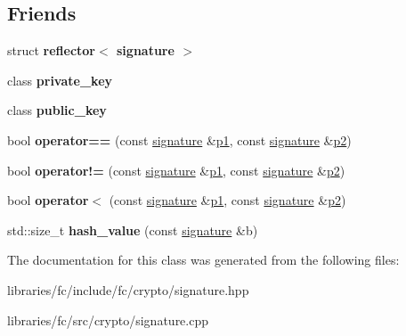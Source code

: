 \subsection*{Friends}
\begin{DoxyCompactItemize}
\item 
\mbox{\label{classfc_1_1crypto_1_1signature_af455309b47ab8c41e1dd36b91498fb47}} 
struct {\bfseries reflector$<$ signature $>$}
\item 
\mbox{\label{classfc_1_1crypto_1_1signature_ae1389c6c19ec8630ce31970de2294915}} 
class {\bfseries private\+\_\+key}
\item 
\mbox{\label{classfc_1_1crypto_1_1signature_a02ee1fa9fb75a71bb167b80862443a52}} 
class {\bfseries public\+\_\+key}
\item 
\mbox{\label{classfc_1_1crypto_1_1signature_ac2e519e4ae4118c9d1801c20f94c893b}} 
bool {\bfseries operator==} (const \mbox{\hyperlink{classfc_1_1crypto_1_1signature}{signature}} \&\mbox{\hyperlink{classp1}{p1}}, const \mbox{\hyperlink{classfc_1_1crypto_1_1signature}{signature}} \&\mbox{\hyperlink{classp2}{p2}})
\item 
\mbox{\label{classfc_1_1crypto_1_1signature_a44b742772ed7aa3e516dd4625abfe1d8}} 
bool {\bfseries operator!=} (const \mbox{\hyperlink{classfc_1_1crypto_1_1signature}{signature}} \&\mbox{\hyperlink{classp1}{p1}}, const \mbox{\hyperlink{classfc_1_1crypto_1_1signature}{signature}} \&\mbox{\hyperlink{classp2}{p2}})
\item 
\mbox{\label{classfc_1_1crypto_1_1signature_afb044052136e9b7515e3da14772089d1}} 
bool {\bfseries operator$<$} (const \mbox{\hyperlink{classfc_1_1crypto_1_1signature}{signature}} \&\mbox{\hyperlink{classp1}{p1}}, const \mbox{\hyperlink{classfc_1_1crypto_1_1signature}{signature}} \&\mbox{\hyperlink{classp2}{p2}})
\item 
\mbox{\label{classfc_1_1crypto_1_1signature_a84a730a17bfc74f917830e31af1fc1a9}} 
std\+::size\+\_\+t {\bfseries hash\+\_\+value} (const \mbox{\hyperlink{classfc_1_1crypto_1_1signature}{signature}} \&b)
\end{DoxyCompactItemize}


The documentation for this class was generated from the following files\+:\begin{DoxyCompactItemize}
\item 
libraries/fc/include/fc/crypto/signature.\+hpp\item 
libraries/fc/src/crypto/signature.\+cpp\end{DoxyCompactItemize}
